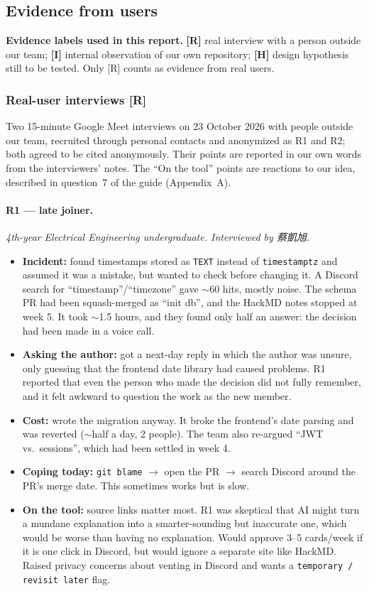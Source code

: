 \documentclass[11pt,a4paper]{article}
\newcommand{\code}[1]{\texttt{#1}}
\newcommand{\ra}{$\rightarrow$}
\begin{document}
\subsection{Evidence from users}\label{sec:evidence}

\textbf{Evidence labels used in this report.} \textbf{[R]} real interview with a person outside our team; \textbf{[I]} internal observation of our own repository; \textbf{[H]} design hypothesis still to be tested. Only [R] counts as evidence from real users.

\subsubsection*{Real-user interviews [R]}

Two 15-minute Google Meet interviews on 23 October 2026 with people outside our team, recruited through personal contacts and anonymized as R1 and R2; both agreed to be cited anonymously. Their points are reported in our own words from the interviewers' notes. The ``On the tool'' points are reactions to our idea, described in question~7 of the guide (Appendix~A).

\paragraph{R1 --- late joiner.}
\emph{4th-year Electrical Engineering undergraduate. Interviewed by 蔡凱旭.}
\begin{itemize}
  \item \textbf{Incident:} found timestamps stored as \code{TEXT} instead of \code{timestamptz} and assumed it was a mistake, but wanted to check before changing it. A Discord search for ``timestamp''/``timezone'' gave $\sim$60 hits, mostly noise. The schema PR had been squash-merged as ``init db'', and the HackMD notes stopped at week 5. It took $\sim$1.5 hours, and they found only half an answer: the decision had been made in a voice call.
  \item \textbf{Asking the author:} got a next-day reply in which the author was unsure, only guessing that the frontend date library had caused problems. R1 reported that even the person who made the decision did not fully remember, and it felt awkward to question the work as the new member.
  \item \textbf{Cost:} wrote the migration anyway. It broke the frontend's date parsing and was reverted ($\sim$half a day, 2 people). The team also re-argued ``JWT vs.\ sessions'', which had been settled in week 4.
  \item \textbf{Coping today:} \code{git blame} \ra{} open the PR \ra{} search Discord around the PR's merge date. This sometimes works but is slow.
  \item \textbf{On the tool:} source links matter most. R1 was skeptical that AI might turn a mundane explanation into a smarter-sounding but inaccurate one, which would be worse than having no explanation. Would approve 3--5 cards/week if it is one click in Discord, but would ignore a separate site like HackMD. Raised privacy concerns about venting in Discord and wants a \code{temporary / revisit later} flag.
\end{itemize}
\end{document}
